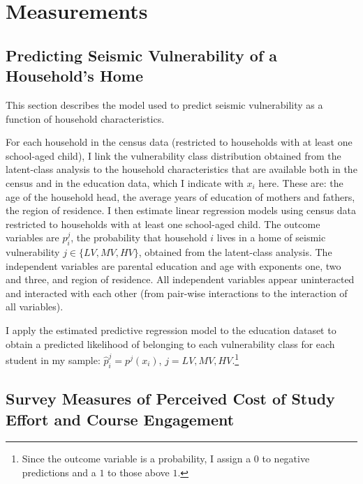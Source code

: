 \section{Measurements}

\subsection{Predicting Seismic Vulnerability of a Household's Home}\label{sec:sv}
This section describes the model used to predict seismic vulnerability as a function of household characteristics.\par  

  For each household in the census data (restricted to households with at least one school-aged child), I link the vulnerability class distribution obtained from the latent-class analysis to the household characteristics that are available both in the census and in the education data, which I indicate with $x_i$ here. These are: the age of the household head, the average years of education of mothers and fathers, the region of residence. I then estimate linear regression models using census data restricted to households with at least one school-aged child. The outcome variables are $p_i^j$, the probability that household $i$ lives in a home of seismic vulnerability $j\in\{LV, MV, HV\}$, obtained from the latent-class analysis. The independent variables are parental education and age with exponents one, two and three, and region of residence. All independent variables appear uninteracted and interacted with each other (from pair-wise interactions to the interaction of all variables). 
  
  
 
 I apply the estimated predictive regression model to the education dataset to obtain a predicted likelihood of belonging to each vulnerability class for each student in my sample: $\hat{p}^j_i=p^j(x_i)$, $j=LV,MV,HV$.\footnote{Since the outcome variable is a probability, I assign a $0$ to negative predictions and a $1$ to those above $1$.} \par
 



\subsection{Survey Measures of Perceived Cost of Study Effort and Course Engagement}\label{sec:surveyeffort}

